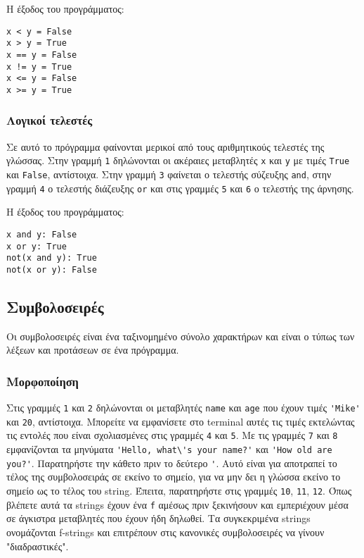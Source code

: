 \documentclass[14pt]{extreport}
\begin{document}
Η έξοδος του προγράμματος:
\begin{lstlisting}
x < y = False
x > y = True
x == y = False
x != y = True
x <= y = False
x >= y = True
\end{lstlisting}

\subsubsection{Λογικοί τελεστές}


Σε αυτό το πρόγραμμα φαίνονται μερικοί από τους αριθμητικούς τελεστές της γλώσσας. Στην γραμμή \lstinline{1} δηλώνονται οι ακέραιες μεταβλητές \lstinline{x} και \lstinline{y} με τιμές \lstinline{True} και \lstinline{False}, αντίστοιχα. Στην γραμμή \lstinline{3} φαίνεται ο τελεστής σύζευξης \lstinline{and}, στην γραμμή \lstinline{4} ο τελεστής διάζευξης \lstinline{or} και στις γραμμές \lstinline{5} και \lstinline{6} ο τελεστής της άρνησης.

Η έξοδος του προγράμματος:
\begin{lstlisting}
x and y: False
x or y: True
not(x and y): True
not(x or y): False
\end{lstlisting}
\subsection{Συμβολοσειρές}

Οι συμβολοσειρές είναι ένα ταξινομημένο σύνολο χαρακτήρων και είναι ο τύπως των λέξεων και προτάσεων σε ένα πρόγραμμα.

\subsubsection{Μορφοποίηση}



Στις γραμμές \lstinline{1} και \lstinline{2} δηλώνονται οι μεταβλητές \lstinline{name} και \lstinline{age} που έχουν τιμές \lstinline{'Mike'} και \lstinline{20}, αντίστοιχα. Μπορείτε να εμφανίσετε στο terminal αυτές τις τιμές εκτελώντας τις εντολές που είναι σχολιασμένες στις γραμμές \lstinline{4} και \lstinline{5}. Με τις γραμμές \lstinline{7} και \lstinline{8} εμφανίζονται τα μηνύματα \lstinline{'Hello, what\'s your name?'} και \lstinline{'How old are you?'}. Παρατηρήστε την κάθετο πριν το δεύτερο \lstinline{'}. Αυτό είναι για αποτραπεί το τέλος της συμβολοσειράς σε εκείνο το σημείο, για να μην δει η γλώσσα εκείνο το σημείο ως το τέλος του string. Έπειτα, παρατηρήστε στις γραμμές \lstinline{10}, \lstinline{11}, \lstinline{12}. Όπως βλέπετε αυτά τα strings έχουν ένα \lstinline{f} αμέσως πριν ξεκινήσουν και εμπεριέχουν μέσα σε άγκιστρα μεταβλητές που έχουν ήδη δηλωθεί. Τα συγκεκριμένα strings ονομάζονται f-strings και επιτρέπουν στις κανονικές συμβολοσειρές να γίνουν "διαδραστικές".
\end{document}
